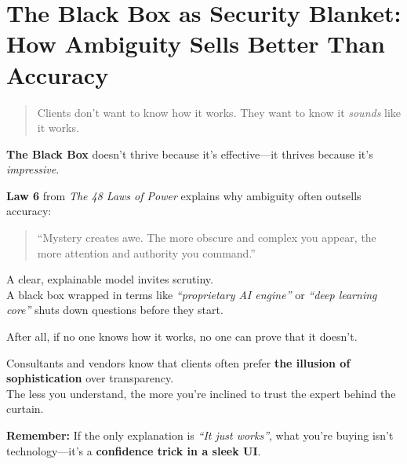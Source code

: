 \section{The Black Box as Security Blanket: How Ambiguity Sells Better Than Accuracy}

\begin{quote}
Clients don’t want to know how it works. They want to know it \textit{sounds} like it works.
\end{quote}

  \textbf{The Black Box} doesn’t thrive because it’s effective—it thrives because it’s \textit{impressive}.
  
  \medskip
  
  \textbf{Law 6} from \textit{The 48 Laws of Power} explains why ambiguity often outsells accuracy:
  \begin{quote}
  ``Mystery creates awe. The more obscure and complex you appear, the more attention and authority you command.''
  \end{quote}
  
  \medskip
  
  A clear, explainable model invites scrutiny. \\
  A black box wrapped in terms like \textit{``proprietary AI engine''} or \textit{``deep learning core''} shuts down questions before they start.
  
  \medskip
  
  After all, if no one knows how it works, no one can prove that it doesn’t.
  
  \medskip
  
  Consultants and vendors know that clients often prefer \textbf{the illusion of sophistication} over transparency. \\
  The less you understand, the more you're inclined to trust the expert behind the curtain.
  
  \medskip
  
  \textbf{Remember:} If the only explanation is \textit{``It just works''}, what you're buying isn’t technology—it’s a \textbf{confidence trick in a sleek UI}.
  


